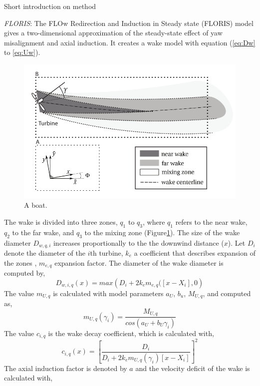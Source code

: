 \documentclass[twoside,twocolumn]{article}
\begin{document}
	Short introduction on method 

	\textit{FLORIS}: The FLOw Redirection and Induction in Steady state (FLORIS) model gives a two-dimensional approximation of the steady-state effect of yaw misalignment and axial induction. It creates a wake model with equation (\ref{eq:Dw} to \ref{eq:Uw}). 
\begin{figure}
  \includegraphics[width=\linewidth]{WakeFLORIS.png}
  \caption{A boat.}
\label{fig:wake}
\end{figure}
The wake is divided into three zones, $q_1$ to $q_3$, where $q_1$ refers to the near wake, $q_2$ to the far wake, and $q_3$ to the mixing zone (Figure\ref{fig:wake}).
The size of the wake diameter $D_{w,q,i}$ increases proportionally to the the downwind distance ($x$). Let $D_i$ denote the diameter of the $i$th turbine, $k_e$ a coefficient that describes expansion of the zones \cite{Gebraad2016}, $m_{e,q}$ expansion factor. The diameter of the wake diameter is computed by,
\begin{equation}
\label{eq:Dw}
D_{w,i,q}(x) = max\left( {D_i + 2k_em_{e,q}([x - X_i],0} \right)
\end{equation}
The value $m_{U,q}$ is calculated with model parameters $a_U$, $b_u$, $M_{U,q}$, and computed as,
\begin{equation}
\label{eq:mU}
m_{U,q}(\gamma_i) =  \frac{M_{U,q}}{cos(a_U+b_U\gamma_i)}
\end{equation}
The value $c_{i,q}$ is the wake decay coefficient, which is calculated with,
\begin{equation}
\label{eq:c}
c_{i,q}(x) = \left[ \frac{D_i}{D_i + 2k_em_{U,q}(\gamma_i)[x - X_i]} \right]^2
\end{equation}
The axial induction factor is denoted by $a$ and the velocity deficit of the wake is calculated with,
\end{document}
